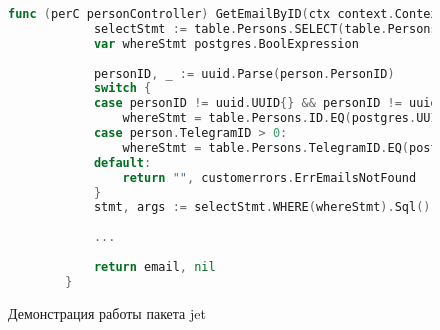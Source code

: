 \begin{figure}
	\begin{lstlisting}[language=go]
		func (perC personController) GetEmailByID(ctx context.Context, person domain.PersonInfo) (string, error){
			selectStmt := table.Persons.SELECT(table.Persons.Email)
			var whereStmt postgres.BoolExpression
		
			personID, _ := uuid.Parse(person.PersonID)
			switch {
			case personID != uuid.UUID{} && personID != uuid.Nil:
				whereStmt = table.Persons.ID.EQ(postgres.UUID(personID))
			case person.TelegramID > 0:
				whereStmt = table.Persons.TelegramID.EQ(postgres.Int64(person.TelegramID))
			default:
				return "", customerrors.ErrEmailsNotFound
			}
			stmt, args := selectStmt.WHERE(whereStmt).Sql()
		
			...
		
			return email, nil
		}
	\end{lstlisting}
	\caption{Демонстрация работы пакета jet}
	\label{libs-jet}
\end{figure}


